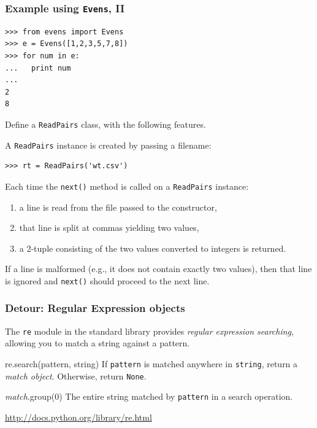 \documentclass[english,serif,mathserif,xcolor=pdftex,dvipsnames,table]{beamer}
\begin{document}
\begin{frame}[fragile]
  \frametitle{Example using \texttt{Evens}, II}
\begin{lstlisting}
>>> from evens import Evens
>>> e = Evens([1,2,3,5,7,8])
>>> for num in e:
...   print num
...
2
8
\end{lstlisting}
\end{frame}


\begin{frame}[fragile]
  \begin{exercise}\small
    Define a \texttt{ReadPairs} class, with the following features.

    \+ A \texttt{ReadPairs} instance is created by passing a filename:
\begin{lstlisting}
>>> rt = ReadPairs('wt.csv')
\end{lstlisting}

    \+ Each time the \texttt{next()} method is called on a \texttt{ReadPairs} instance:
    \begin{enumerate}
    \item a line is read from the file passed to the constructor,
    \item that line is split at commas yielding two values,
    \item a 2-tuple consisting of the two values converted to integers is returned.
    \end{enumerate}

    \+ If a line is malformed (e.g., it does not contain exactly two
    values), then that line is ignored and \texttt{next()} should
    proceed to the next line.
  \end{exercise}
\end{frame}


\begin{frame}
  \frametitle{Detour: Regular Expression objects}
  The \texttt{re} module in the standard library provides
  \emph{regular expression searching}, allowing you to match a string
  against a pattern.

  \+
  \begin{describe}{re.search(pattern, string)}
    If \texttt{pattern} is matched anywhere in \texttt{string}, return
    a \emph{match object}.  Otherwise, return \texttt{None}.
  \end{describe}

  \+
  \begin{describe}{\emph{match}.group(0)}
    The entire string matched by \texttt{pattern} in a search operation.
  \end{describe}

  \+
  \begin{references}
    \url{http://docs.python.org/library/re.html}
  \end{references}
\end{frame}
\end{document}
